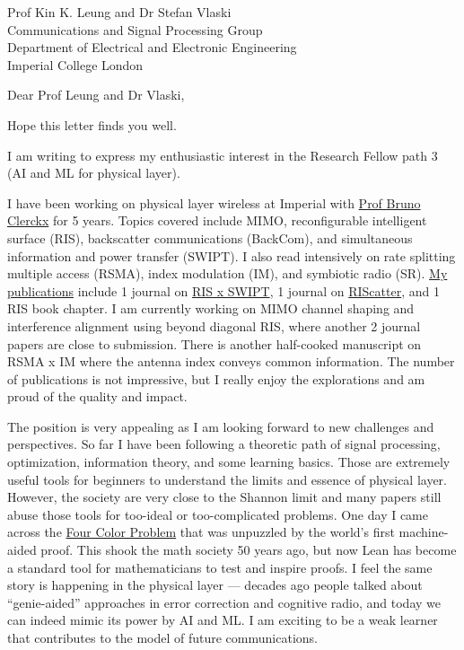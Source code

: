 \documentclass[10pt]{scrartcl}
\begin{document}

\begin{letter}{%
		Prof Kin K. Leung and Dr Stefan Vlaski\\
		Communications and Signal Processing Group\\
		Department of Electrical and Electronic Engineering\\
		Imperial College London
	}
	\opening{Dear Prof Leung and Dr Vlaski,}

	Hope this letter finds you well.

	I am writing to express my enthusiastic interest in the Research Fellow path 3 (AI and ML for physical layer).

	I have been working on physical layer wireless at Imperial with \href{https://www.imperial.ac.uk/people/b.clerckx}{Prof Bruno Clerckx} for 5 years.
	Topics covered include MIMO, reconfigurable intelligent surface (RIS), backscatter communications (BackCom), and simultaneous information and power transfer (SWIPT).
	I also read intensively on rate splitting multiple access (RSMA), index modulation (IM), and symbiotic radio (SR).
	\href{https://scholar.google.co.uk/citations?user=ckmF3VsAAAAJ&hl=en}{My publications} include 1 journal on \href{https://github.com/snowztail/irs-aided-swipt-joint-waveform-active-and-passive-beamforming-design-under-nonlinear-harvester-model}{RIS x SWIPT}, 1 journal on \href{https://github.com/snowztail/riscatter-unifying-backscatter-communication-and-reconfigurable-intelligent-surface}{RIScatter}, and 1 RIS book chapter.
	I am currently working on MIMO channel shaping and interference alignment using beyond diagonal RIS, where another 2 journal papers are close to submission.
	There is another half-cooked manuscript on RSMA x IM where the antenna index conveys common information.
	The number of publications is not impressive, but I really enjoy the explorations and am proud of the quality and impact.

	The position is very appealing as I am looking forward to new challenges and perspectives.
	So far I have been following a theoretic path of signal processing, optimization, information theory, and some learning basics.
	Those are extremely useful tools for beginners to understand the limits and essence of physical layer.
	However, the society are very close to the Shannon limit and many papers still abuse those tools for too-ideal or too-complicated problems.
	One day I came across the \href{https://en.wikipedia.org/wiki/Four_color_theorem}{Four Color Problem} that was unpuzzled by the world's first machine-aided proof.
	This shook the math society 50 years ago, but now Lean has become a standard tool for mathematicians to test and inspire proofs.
	I feel the same story is happening in the physical layer --- decades ago people talked about ``genie-aided'' approaches in error correction and cognitive radio, and today we can indeed mimic its power by AI and ML.
	I am exciting to be a weak learner that contributes to the model of future communications.


\end{letter}
\end{document}
